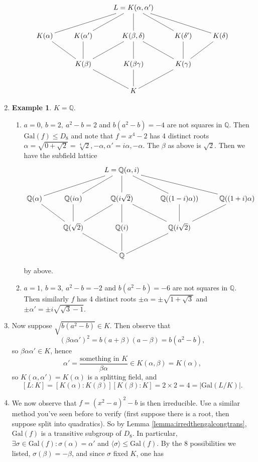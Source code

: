 \documentclass[a4paper]{article}
\newcommand{\Q}{\mathbb Q}
\newcommand{\gal}{\text{Gal}}
\theoremstyle{definition}
\newtheorem{example}[defn]{Example}
\begin{document}
\begin{enumerate}
\[
\xymatrix{
& & L=K(\alpha,\alpha')\ar@{-}[dll]\ar@{-}[dl]\ar@{-}[d]\ar@{-}[dr]\ar@{-}[drr] \\
K(\alpha)\ar@{-}[dr] & K(\alpha')\ar@{-}[d] & K(\beta,\delta)\ar@{-}[dl]\ar@{-}[d]\ar@{-}[dr] & K(\delta')\ar@{-}[d] & K(\delta)\ar@{-}[dl] \\
& K(\beta)\ar@{-}[dr] & K(\beta\gamma)\ar@{-}[d] & K(\gamma)\ar@{-}[dl] & \\
& & K
}
\]
\item \begin{example}
$K=\Q$.
\begin{enumerate}
\item $a=0,\ b=2,\ a^2-b=2$ and $b(a^2-b)=-4$ are not squares in $\Q$. Then $\gal(f)\leq D_8$ and note that $f=x^4-2$ has 4 distinct roots $\alpha=\sqrt{0+\sqrt2}=\sqrt[4]2,-\alpha,\alpha'=i\alpha,-\alpha$. The $\beta$ as above is $\sqrt2$. Then we have the subfield lattice
\[
\xymatrix{
& & L=\Q(\alpha,i)\ar@{-}[dll]\ar@{-}[dl]\ar@{-}[d]\ar@{-}[dr]\ar@{-}[drr] \\
\Q(\alpha)\ar@{-}[dr] & \Q(i\alpha)\ar@{-}[d] & \Q(i\sqrt2)\ar@{-}[dl]\ar@{-}[d]\ar@{-}[dr] & \Q((1-i)\alpha))\ar@{-}[d] & \Q((1+i)\alpha)\ar@{-}[dl] \\
& \Q(\sqrt2)\ar@{-}[dr] & \Q(i)\ar@{-}[d] & \Q(i\sqrt2)\ar@{-}[dl] & \\
& & \Q
}
\]
by above.
\item $a=1,\ b=3,\ a^2-b=-2$ and $b(a^2-b)=-6$ are not squares in $\Q$. Then similarly $f$ has 4 distinct roots $\pm\alpha=\pm\sqrt{1+\sqrt3}$ and $\pm\alpha'=\pm i\sqrt{\sqrt3-1}$.
\end{enumerate}
\end{example}
\item Now suppose $\sqrt{b(a^2-b)}\in K$. Then observe that
\[
(\beta\alpha\alpha')^2=b(a+\beta)(a-\beta)=b(a^2-b),
\]
so $\beta\alpha\alpha'\in K$, hence
\[
\alpha'=\frac{\text{something in }K}{\beta\alpha}\in K(\alpha,\beta)=K(\alpha),
\]
so $K(\alpha,\alpha')=K(\alpha)$ is a splitting field, and
\[
[L:K]=[K(\alpha):K(\beta)][K(\beta):K]=2\times 2=4=|\gal(L/K)|.
\]
\item We now observe that $f=(x^2-a)^2-b$ is then irreducible. Use a similar method you've seen before to verify (first suppose there is a root, then suppose split into quadratics). So by Lemma \ref{lemma:irredthengalcongtrans}, $\gal(f)$ is a transitive subgroup of $D_8$. In particular, $\exists\sigma\in\gal(f):\sigma(\alpha)=\alpha'$ and $\langle\sigma\rangle\leq\gal(f)$. By the 8 possibilities we listed, $\sigma(\beta)=-\beta$, and since $\sigma$ fixed $K$, one has

\end{enumerate}
\end{document}
